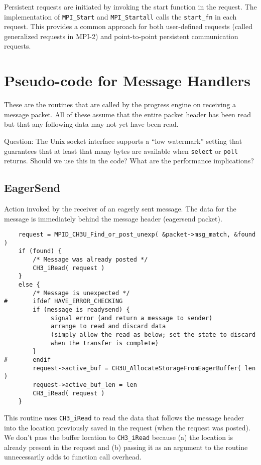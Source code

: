 \documentclass{article}
\def\code{\begingroup\makeustext\eatcode}
\def\eatcode#1{\texttt{#1}\endgroup}
\begin{document}
Persistent requests are initiated by invoking the start function in
the request.  The implementation of \code{MPI_Start} and
\code{MPI_Startall} calls the \code{start_fn} in each request.  This
provides a common approach for both user-defined requests (called
generalized requests in MPI-2) and point-to-point persistent
communication requests.

\section{Pseudo-code for Message Handlers}
\label{sec:handlers}
\label{sec:agent}
These are the routines that are called by the progress engine on receiving a
message packet.  All of these assume that the entire packet header has been 
read but that any following data may not yet have been read.  

Question: The Unix socket interface supports a ``low watermark''
setting that guarantees that at least that many bytes are available
when \code{select} or \code{poll} returns.  Should we use this in the
code?  What are the performance implications?

\subsection{EagerSend}
Action invoked by the receiver of an eagerly sent message.  The data for the
message is immediately behind the message header (eagersend packet).
\begin{verbatim}
    request = MPID_CH3U_Find_or_post_unexp( &packet->msg_match, &found )
    if (found) {
        /* Message was already posted */
        CH3_iRead( request )
    }
    else {
        /* Message is unexpected */
#       ifdef HAVE_ERROR_CHECKING
        if (message is readysend) {
             signal error (and return a message to sender)
             arrange to read and discard data 
             (simply allow the read as below; set the state to discard
             when the transfer is complete)
        }
#       endif
        request->active_buf = CH3U_AllocateStorageFromEagerBuffer( len )
        request->active_buf_len = len
        CH3_iRead( request )
    }
\end{verbatim}
This routine uses \code{CH3\_iRead} to read the data that follows the
message header into the location previously saved in the request (when
the request was posted).  We don't pass the buffer location to
\code{CH3\_iRead} because (a) the location is already present in the
request and (b) passing it as an argument to the routine unnecessarily
adds to function call overhead.
\end{document}
